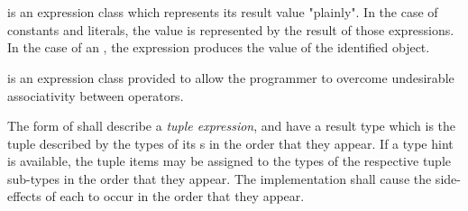 \begin{grammar}
 \\
	 \\
	 \\
	 \\
	 \\

 \\
	 \\
	\terminal{(}  \terminal{)} \\
	\terminal{(}  \terminal{)} \\

 \\
	 \terminal{,}  \optional{\terminal{,}} \\
	 \terminal{,}  \\
\end{grammar}

\specsubsubitem
{} is an expression class which represents its
result value "plainly". In the case of constants and literals, the value is
represented by the result of those expressions. In the case of an
, the expression produces the value of the identified
object.

\specsubsubitem
{} is an expression class provided to allow the
programmer to overcome undesirable associativity between operators.

\specsubsubitem
The  form of  shall
describe a \textit{tuple expression}, and have a result type which is the tuple
described by the types of its s in the order that they
appear. If a type hint is available, the tuple items may be assigned to the
types of the respective tuple sub-types in the order that they appear. The
implementation shall cause the side-effects of each  to
occur in the order that they appear.


\begin{grammar}
 \\
	 \terminal{(}  \terminal{)} \\
	 \terminal{(}   \terminal{)} \\
	 \terminal{(}  \terminal{,}  \terminal{)} \\
	 \terminal{(}  \terminal{)} \\
\end{grammar}

